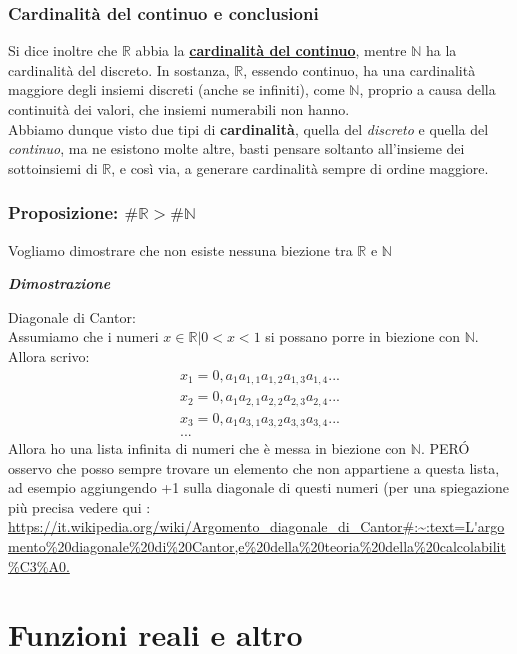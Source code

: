 \documentclass{article}
\theoremstyle{definition}
\newcommand{\R}{\mathbb{R}}
\newcommand{\N}{\mathbb{N}}
\begin{document}
\subsubsection{Cardinalità del continuo e conclusioni}
Si dice inoltre che $\mathbb{R}$ abbia la \textbf{\underline{cardinalità del continuo}}, mentre $\mathbb{N}$ ha la cardinalità del discreto.
In sostanza, $\mathbb{R}$, essendo continuo, ha una cardinalità maggiore degli insiemi discreti (anche se infiniti), come $\mathbb{N}$, proprio a causa della continuità dei valori, che insiemi numerabili non hanno.
\\

Abbiamo dunque visto due tipi di \textbf{cardinalità}, quella del \textit{discreto} e quella del \textit{continuo}, ma ne esistono molte altre, basti pensare soltanto all'insieme dei sottoinsiemi di $\mathbb{R}$, e così via, a generare cardinalità sempre di ordine maggiore.

\subsubsection{Proposizione: $\#\R > \#\N$}
Vogliamo dimostrare che non esiste nessuna biezione tra $\R$ e $\N$
\begin{center}
    \textbf{\textit{Dimostrazione}}
\end{center}
Diagonale di Cantor:
\\
Assumiamo che i numeri $x \in \R | 0 < x < 1$ si possano porre in biezione con $\N$.
\\
Allora scrivo:
\begin{align*}
    x_1=0,a_1a_{1,1}a_{1,2}a_{1,3}a_{1,4}... \\
     x_2=0,a_1a_{2,1}a_{2,2}a_{2,3}a_{2,4}...\\
      x_3=0,a_1a_{3,1}a_{3,2}a_{3,3}a_{3,4}...\\
       ...
\end{align*}
Allora ho una lista infinita di numeri che è messa in biezione con $\N$. PER\'O osservo che posso sempre trovare un elemento che non appartiene a questa lista, ad esempio aggiungendo +1 sulla diagonale di questi numeri (per una spiegazione più precisa vedere qui : \\\url{https://it.wikipedia.org/wiki/Argomento_diagonale_di_Cantor#:~:text=L'argomento%20diagonale%20di%20Cantor,e%20della%20teoria%20della%20calcolabilit%C3%A0.}
\newpage
\section{Funzioni reali e altro}
\end{document}
